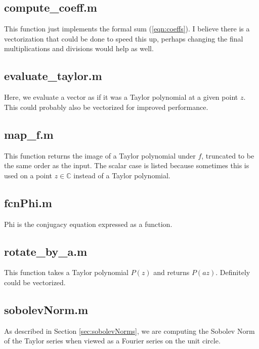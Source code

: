 \documentclass{article}
\newcommand{\C}{\mathbb{C}}
\theoremstyle{plain}
\theoremstyle{remark}
\begin{document}
\subsection{compute\_coeff.m}


This function just implements the formal sum (\ref{eqn:coeffs}). 
I believe there is a vectorization that could be done to speed this up, perhaps changing the final multiplications and divisions would help as well. 

\subsection{evaluate\_taylor.m}


Here, we evaluate a vector as if it was a Taylor polynomial at a given point $z$. 
This could probably also be vectorized for improved performance. 

\subsection{map\_f.m}


This function returns the image of a Taylor polynomial under $f$, truncated to be the same order as the input. 
The scalar case is listed because sometimes this is used on a point $z \in \C$ instead of a Taylor polynomial. 

\subsection{fcnPhi.m}


Phi is the conjugacy equation expressed as a function. 

\subsection{rotate\_by\_a.m}


This function takes a Taylor polynomial $P(z)$ and returns $P(az)$. 
Definitely could be vectorized. 

\subsection{sobolevNorm.m}


As described in Section \ref{sec:sobolevNorms}, we are computing the Sobolev Norm of the Taylor series when viewed as a Fourier series on the unit circle. 
\end{document}
